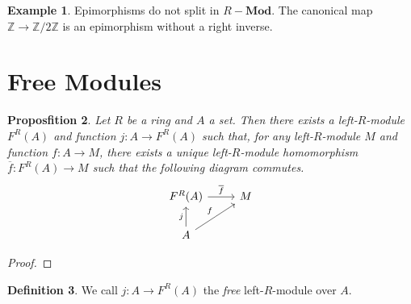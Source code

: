 \documentclass{book}
\newtheorem{prop}{Proposfition}[chapter]
\theoremstyle{definition}
\newtheorem{df}[prop]{Definition}
\newtheorem{ex}[prop]{Example}
\newcommand{\Mod}[1]{\ensuremath{{#1}-\mathbf{Mod}}}
\begin{document}
\begin{ex}
Epimorphisms do not split in $\Mod{R}$. The canonical map $\mathbb{Z} \rightarrow \mathbb{Z} / 2 \mathbb{Z}$ is an epimorphism without a right inverse.
\end{ex}

\section{Free Modules}

\begin{prop}
Let $R$ be a ring and $A$ a set. Then there exists a left-$R$-module $F^R(A)$ and function $j : A \rightarrow F^R(A)$ such that, for any left-$R$-module $M$ and function $f : A \rightarrow M$, there exists a unique left-$R$-module homomorphism $\overline{f} : F^R(A) \rightarrow M$ such that the following diagram commutes.
\[ \begin{tikzcd}
F^R(A) \arrow[r,"\overline{f}"] & M \\
A \arrow[u,"j"] \arrow[ur,"f"]
\end{tikzcd} \]
\end{prop}

\begin{proof}
\pf
{}
\end{proof}

\begin{df}
We call $j : A \rightarrow F^R(A)$ the \emph{free} left-$R$-module over $A$.
\end{df}
\end{document}
